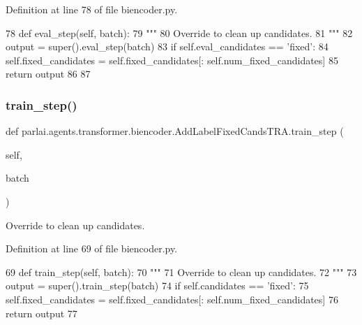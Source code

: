 Definition at line 78 of file biencoder.\+py.


\begin{DoxyCode}
78     \textcolor{keyword}{def }eval\_step(self, batch):
79         \textcolor{stringliteral}{"""}
80 \textcolor{stringliteral}{        Override to clean up candidates.}
81 \textcolor{stringliteral}{        """}
82         output = super().eval\_step(batch)
83         \textcolor{keywordflow}{if} self.eval\_candidates == \textcolor{stringliteral}{'fixed'}:
84             self.fixed\_candidates = self.fixed\_candidates[: self.num\_fixed\_candidates]
85         \textcolor{keywordflow}{return} output
86 
87 
\end{DoxyCode}
\mbox{\label{classparlai_1_1agents_1_1transformer_1_1biencoder_1_1AddLabelFixedCandsTRA_ae051c7783bdd5e8b9ddc920059409b5d}} 
\subsubsection{\texorpdfstring{train\+\_\+step()}{train\_step()}}
{\footnotesize\ttfamily def parlai.\+agents.\+transformer.\+biencoder.\+Add\+Label\+Fixed\+Cands\+T\+R\+A.\+train\+\_\+step (\begin{DoxyParamCaption}\item[{}]{self,  }\item[{}]{batch }\end{DoxyParamCaption})}

\begin{DoxyVerb}Override to clean up candidates.
\end{DoxyVerb}
 

Definition at line 69 of file biencoder.\+py.


\begin{DoxyCode}
69     \textcolor{keyword}{def }train\_step(self, batch):
70         \textcolor{stringliteral}{"""}
71 \textcolor{stringliteral}{        Override to clean up candidates.}
72 \textcolor{stringliteral}{        """}
73         output = super().train\_step(batch)
74         \textcolor{keywordflow}{if} self.candidates == \textcolor{stringliteral}{'fixed'}:
75             self.fixed\_candidates = self.fixed\_candidates[: self.num\_fixed\_candidates]
76         \textcolor{keywordflow}{return} output
77 
\end{DoxyCode}


